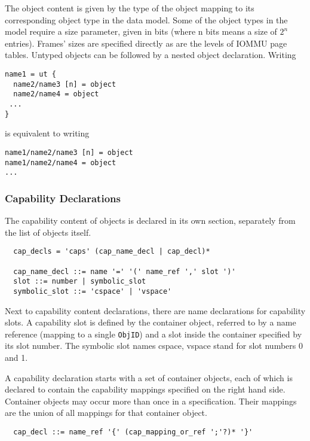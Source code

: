 \documentclass[a4paper,12pt]{article}
\begin{document}
The object content is given by the type of the object mapping to its 
corresponding object type in the data model. Some of the object types in the 
model require a size parameter, given in bits (where n bits means a size of 
$2^n$ entries). Frames' sizes are specified directly as are the levels of IOMMU 
page tables. Untyped objects can be followed by a nested object declaration. 
Writing 

\begin{verbatim}
name1 = ut {
  name2/name3 [n] = object
  name2/name4 = object
 ...
}
\end{verbatim}

is equivalent to writing

\begin{verbatim}
name1/name2/name3 [n] = object
name1/name2/name4 = object
...
\end{verbatim}


\subsubsection{Capability Declarations}

The capability content of objects is declared in its own section, separately from the list of objects itself.

\begin{verbatim}
  cap_decls = 'caps' (cap_name_decl | cap_decl)*

  cap_name_decl ::= name '=' '(' name_ref ',' slot ')'
  slot ::= number | symbolic_slot
  symbolic_slot ::= 'cspace' | 'vspace' 
\end{verbatim}

Next to capability content declarations, there are name declarations for capability slots. A capability slot is defined by the container object, referred to by a name reference (mapping to a single \texttt{ObjID}) and a slot inside the container specified by its slot number. The symbolic slot names cspace, vspace stand for slot numbers 0 and 1.

A capability declaration starts with a set of container objects, each of which is declared to contain the capability mappings specified on the right hand side. Container objects may occur more than once in a specification. Their mappings are the union of all mappings for that container object.

\begin{verbatim}
  cap_decl ::= name_ref '{' (cap_mapping_or_ref ';'?)* '}'
\end{verbatim}
\end{document}
